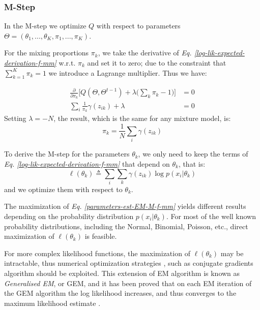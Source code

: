 \subsubsection{M-Step}
In the M-step we optimize $Q$ with respect to parameters $\Theta = (\theta_{1},...,\theta_{K},\pi_{1},...,\pi_{K})$.

For the mixing proportions $\pi_{k}$, we take the derivative of \emph{Eq. \ref{log-lik-expected-derivation-f-mm}} w.r.t. $\pi_{k}$ and set it to zero; due to the constraint that $\sum_{k=1}^{K}\pi_{k} = 1$ we introduce a Lagrange multiplier. Thus we have:

\begin{equation} \label{derivative-mix-prop-f-mm}
  \begin{aligned}
	\frac{\partial}{\partial \pi_{k}} \bigg[  Q(\Theta, \Theta^{t-1}) + \lambda \big( \sum_{k}\pi_{k} - 1\big) \bigg] & = 0 \\
	\sum_{i} \frac{1}{\pi_{k}} \gamma(z_{ik}) + \lambda & = 0 
  \end{aligned}
\end{equation}
Setting $\lambda = - N$, the result, which is the same for any mixture model, is:
\begin{equation} \label{mixing-proportions-est-f-mm}
		\pi_{k} = \frac{1}{N} \sum_{i} \gamma(z_{ik})
\end{equation}

To derive the M-step for the parameters $\theta_{k}$, we only need to keep the terms of \emph{Eq. \ref{log-lik-expected-derivation-f-mm}} that depend on $\theta_{k}$, that is:
\begin{equation} \label{parameters-est-EM-M-f-mm}
		\ell(\theta_{k}) \triangleq \sum_{i} \sum_{k} \gamma(z_{ik}) \log p(x_{i}|\theta_{k})
\end{equation}
and we optimize them with respect to $\theta_{k}$.

The maximization of \emph{Eq. \ref{parameters-est-EM-M-f-mm}} yields different results depending on the probability distribution $p(x_{i}|\theta_{k})$. For most of the well known probability distributions, including the Normal, Binomial, Poisson, etc., direct maximization of $\ell(\theta_{k})$ is feasible. 

For more complex likelihood functions, the maximization of $\ell(\theta_{k})$ may be intractable, thus numerical optimization strategies \citep{Nocedal2006}, such as conjugate gradients algorithm \citep{Hestenes1952} should be exploited. This extension of EM algorithm is known as \emph{Generalised EM}, or GEM, and it has been proved that on each EM iteration of the GEM algorithm the log likelihood increases, and thus converges to the maximum likelihood estimate \citep{Wu1983}.